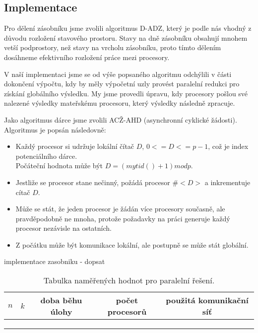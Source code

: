 \documentclass[12pt]{article}
\begin{document}
\subsection{Implementace}

Pro dělení zásobníku jsme zvolili algoritmus D-ADZ, který je podle nás vhodný z důvodu
rozložení stavového prostoru. Stavy na dně zásobníku obsahují mnohem vetší podprostory, než stavy
na vrcholu zásobníku, proto tímto dělením dosáhneme efektivního rozložení práce mezi procesory.

V naší implementaci jsme se od výše popsaného algoritmu odchýlili v části dokončení výpočtu,
kdy by měly výpočetní uzly provést paralelní redukci pro získání globálního výsledku.
My jsme provedli úpravu, kdy procesory pošlou své nalezené výsledky mateřskému procesoru, který výsledky
následně zpracuje.

Jako algoritmus dárce jsme zvolili ACŽ-AHD (asynchronní cyklické žádosti). Algoritmus je popsán následovně:
\begin{itemize}
  \item{Každý procesor si udržuje lokální čítač $D$, 
  $0 <= D <= p - 1$, což je index potenciálního dárce.\\
    Počáteční hodnota může být $D = (mytid() + 1) mod p$.}
  \item{Jestliže se procesor stane nečinný, požádá procesor $\#<D>$ a inkrementuje cítač $D$.}
  \item{Může se stát, že jeden procesor je žádán více procesory současně, ale pravděpodobně ne mnoha, protože
  požadavky na práci generuje každý procesor nezávisle na ostatních.}
  \item{Z počátku může být komunikace lokální, ale postupně se může stát globální.}
\end{itemize}

implementace zasobniku - dopsat


\begin{table}[ht]
  \begin{center}
    \begin{tabular}{| c | c | c | c | c |}
      \hline
      $n$ & $k$ & doba běhu úlohy & počet procesorů & použitá komunikační síť\\ \hline
      & & \\ \hline
      & & \\ \hline
      & & \\
      \hline
    \end{tabular}
    \caption{Tabulka naměřených hodnot pro paralelní řešení.}
  \end{center}
\end{table}
\end{document}
